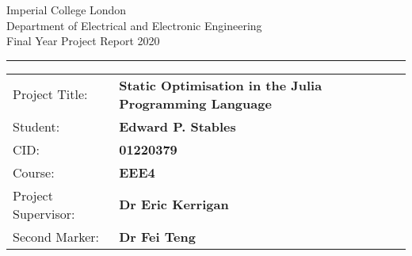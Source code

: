 \begin{titlepage}
                \setlength{\parindent}{0pt}
                \setlength{\parskip}{0pt}

                {
                                \Large
                                \raggedright
                                Imperial College London\\[17pt]
                                Department of Electrical and Electronic Engineering\\[17pt]
                                Final Year Project Report 2020\\[17pt]
 
                }

                \rule{\columnwidth}{3pt}
                \setlength{\tabcolsep}{0pt}

                \begin{tabular}{p{40mm}p{\dimexpr\columnwidth-40mm}}
                                Project Title: & \textbf{Static Optimisation in the Julia Programming Language} \\[12pt]
                                Student: & \textbf{Edward P. Stables} \\[12pt]
                                CID: & \textbf{01220379} \\[12pt]
                                Course: & \textbf{EEE4} \\[12pt]
                                Project Supervisor: & \textbf{Dr Eric Kerrigan} \\[12pt]
                                Second Marker: & \textbf{Dr Fei Teng} \\
                \end{tabular}
\end{titlepage}